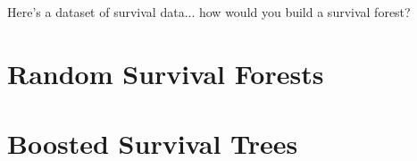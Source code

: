 \begin{question}{}
Here's a dataset of survival data... how would you build a survival forest?
\end{question}


\section{Random Survival Forests}


\section{Boosted Survival Trees}


